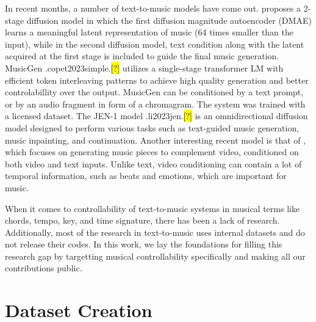 \documentclass[11pt]{article}
\let\realcite\cite
\renewcommand{\cite}[1]{\ifx.#1.\hl{[?]}\else\realcite{#1}\fi}
\begin{document}
In recent months, a number of text-to-music models have come out. \citet{mousai} proposes a 2-stage diffusion model in which the first diffusion magnitude autoencoder (DMAE) learns a meaningful latent representation of music (64 times smaller than the input), while in the second diffusion model, text condition along with the latent acquired at the first stage is included to guide the final music generation.  MusicGen \cite{copet2023simple} utilizes a single-stage transformer LM with efficient token interleaving patterns to achieve high quality generation and better controlabillity over the output. MusicGen can be conditioned by a text prompt, or by an audio fragment in form of a chromagram. The system was trained with a licensed dataset. The JEN-1 model \cite{li2023jen} is an omnidirectional diffusion model designed to perform various tasks such as text-guided music generation, music inpainting, and continuation. 
Another interesting recent model is that of \citet{su2023v2meow}, which focuses on generating music pieces to complement video, conditioned on both video and text inputs. Unlike text, video conditioning can contain a lot of temporal information, such as beats and emotions, which are important for music. 

When it comes to controllability of text-to-music systems in musical terms like chords, tempo, key, and time signature, there has been a lack of research. Additionally, most of the research in text-to-music uses internal datasets and do not release their codes. In this work, we lay the foundations for filling this research gap by targetting musical controllability specifically and making all our contributions public.










































%
 \section{Dataset Creation}\label{sec:method}
\end{document}
